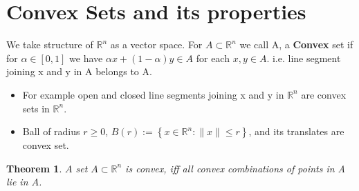 \documentclass[oneside]{book}
\newtheorem{theorem}{Theorem}[section]
\begin{document}
	
	
	
	
	
	
	
	
	
	
	
	
	
	
	
	
	
	
	
	
	
	
	
	
	
	
	
	
	
	
	
	
	
	
	
	\section{Convex Sets and its properties } \label{s:4}
	We take structure of  $\mathbb{R}^n$ as a vector space. 
	For $ A \subset \mathbb{R}^n$ we call A, a \textbf{Convex} set  if for $\alpha \in [0,1]$ we have $\alpha x +(1- \alpha)y \in A $ for each  $x, y \in A.$  i.e. line segment joining x and y in A belongs to A.\\
	\begin{itemize}
		\item  For example open and closed line segments joining x and y in $\mathbb{R}^n$ are convex sets in $\mathbb{R}^n$.
		
		\item  
		
		Ball of radius $r \geq 0$,  $B (r):=\left\{x \in \mathbb{R}^{n}:\|x\| \leq r\right\}$,  and its translates are convex set.
		
	\end{itemize}
	
	
	\begin{theorem}
		\label{t:4.5}
		$A$ set $A \subset \mathbb{R}^{n}$ is convex, iff  all convex combinations of points in A lie
		in $A$.
	\end{theorem}
	
\end{document}
